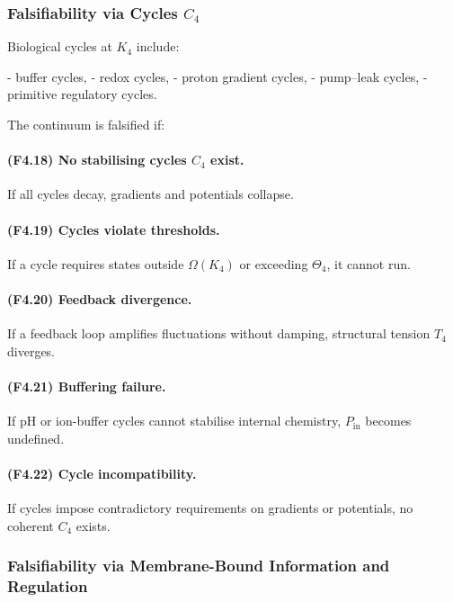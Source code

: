 \subsubsection{Falsifiability via Cycles \texorpdfstring{$C_4$}{C_4}}

Biological cycles at $K_4$ include:

- buffer cycles,
- redox cycles,
- proton gradient cycles,
- pump–leak cycles,
- primitive regulatory cycles.

The continuum is falsified if:

\paragraph{(F4.18) No stabilising cycles \texorpdfstring{$C_4$}{C_4} exist.}
If all cycles decay, gradients and potentials collapse.

\paragraph{(F4.19) Cycles violate thresholds.}
If a cycle requires states outside $\Omega(K_4)$ or exceeding
$\Theta_4$, it cannot run.

\paragraph{(F4.20) Feedback divergence.}
If a feedback loop amplifies fluctuations without damping,
structural tension $T_4$ diverges.

\paragraph{(F4.21) Buffering failure.}
If pH or ion-buffer cycles cannot stabilise internal chemistry,
$P_{\mathrm{in}}$ becomes undefined.

\paragraph{(F4.22) Cycle incompatibility.}
If cycles impose contradictory requirements on gradients or potentials,
no coherent $C_4$ exists.



\subsubsection{Falsifiability via Membrane-Bound Information and Regulation}

